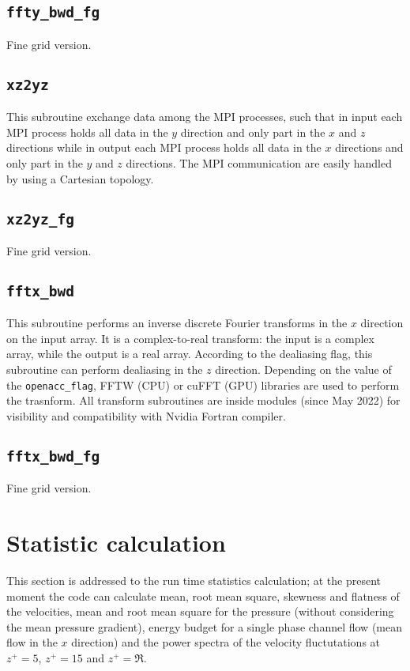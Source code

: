 \subsection{\texttt{ffty\_bwd\_fg}}
Fine grid version.

\subsection{\texttt{xz2yz}}
This subroutine exchange data among the MPI processes, such that in input each MPI process holds all data in the $y$ direction and only part in the $x$ and $z$ directions while in output each MPI process holds all data in the $x$ directions and only part in the $y$ and $z$ directions. The MPI communication are easily handled by using a Cartesian topology.

\subsection{\texttt{xz2yz\_fg}}
Fine grid version.

\subsection{\texttt{fftx\_bwd}}
This subroutine performs an inverse discrete Fourier transforms in the $x$ direction on the input array. It is a complex-to-real transform: the input is a complex array, while the output is a real array. According to the dealiasing flag, this subroutine can perform dealiasing in the $z$ direction.
Depending on the value of the \texttt{openacc\_flag}, FFTW (CPU) or cuFFT (GPU) libraries are used to perform the trasnform.
All transform subroutines are inside modules (since May 2022) for visibility and compatibility with Nvidia Fortran compiler.

\subsection{\texttt{fftx\_bwd\_fg}}
Fine grid version.




\section{Statistic calculation}
This section is addressed to the run time statistics calculation; at the present moment the code can calculate mean, root mean square, skewness and flatness of the velocities, mean and root mean square for the pressure (without considering the mean pressure gradient), energy budget for a single phase channel flow (mean flow in the $x$ direction) and the power spectra of the velocity fluctutations at $z^+=5$, $z^+=15$ and $z^+=\Re$.


